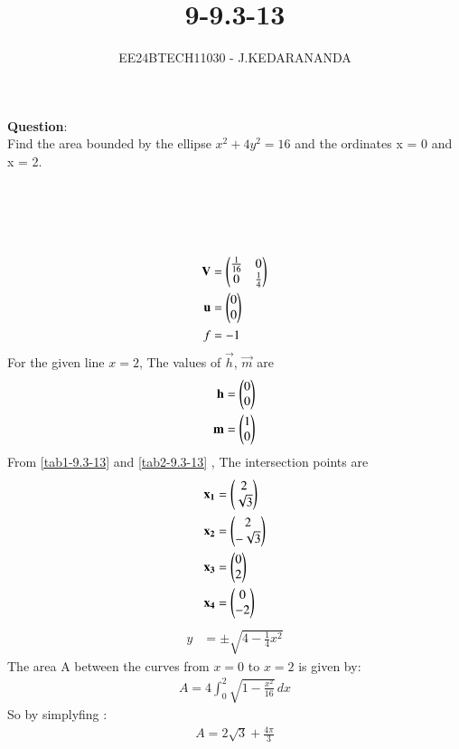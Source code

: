 \documentclass[journal]{IEEEtran}
\numberwithin{equation}{enumi}
\numberwithin{figure}{enumi}
\begin{document}

\title{9-9.3-13}
\author{EE24BTECH11030 - J.KEDARANANDA}
{\let\newpage\relax\maketitle}
\textbf{Question}:\\
Find the area bounded by the ellipse $x^2 + 4y^2 = 16$ and the ordinates x = 0 and x = 2.
\\
\solution \\
\begin{table}[h!]    
  \centering
  
  \caption{}
  \label{tab1-9.3-13}
\end{table}\\
\begin{table}[h!]    
  \centering
  
  \caption{}
  \label{tab2-9.3-13}
\end{table}\\
\begin{align}
\mathbf{V}&=\begin{pmatrix}\frac{1}{16} & 0\\0 & \frac{1}{4}\end{pmatrix}\\
\mathbf{u}&=\begin{pmatrix}0\\0\end{pmatrix}\\
f&=-1
\end{align}
For the given line $x=2$, The values of $\vec{h}$, $\vec{m}$ are
\begin{align}
\mathbf{h}&=\begin{pmatrix}0\\0\end{pmatrix}\\
\mathbf{m}&=\begin{pmatrix}1\\0\end{pmatrix}
\end{align}
From \ref{tab1-9.3-13} and \ref{tab2-9.3-13} , The intersection points are
\begin{align}
\mathbf{x_1} &= \begin{pmatrix}2\\\sqrt{3}\end{pmatrix}\\
\mathbf{x_2} &= \begin{pmatrix}2\\-\sqrt{3}\end{pmatrix}\\
\mathbf{x_3} &= \begin{pmatrix}0\\2\end{pmatrix}\\
\mathbf{x_4} &= \begin{pmatrix}0\\-2\end{pmatrix}\\
\end{align}
\begin{align}
y &= \pm \sqrt{4 - \frac{1}{4}x^2}
\end{align}
The area A  between the curves from \( x = 0 \) to \( x = 2 \) is given by:
\begin{align}
A = 4 \int_0^2 \sqrt{1 - \frac{x^2}{16}} \, dx
\end{align}
So by simplyfing :
\begin{align}
A = 2\sqrt{3} + \frac{4\pi}{3}
\end{align}
\end{document}
